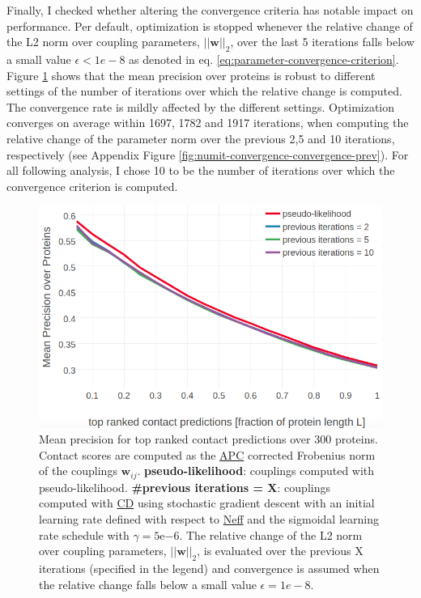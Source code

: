 \documentclass[11pt,a4paper,twoside]{book}
\newcommand{\eq}{\!=\!}
\newcommand{\w}{\mathbf{w}}
\newcommand{\wij}{\mathbf{w}_{ij}}
\theoremstyle{definition}
\theoremstyle{definition}
\theoremstyle{remark}
\begin{document}
Finally, I checked whether altering the convergence criteria has notable
impact on performance. Per default, optimization is stopped whenever the
relative change of the L2 norm over coupling parameters, \(||\w||_2\),
over the last 5 iterations falls below a small value \(\epsilon < 1e-8\)
as denoted in eq. \eqref{eq:parameter-convergence-criterion}. Figure
\ref{fig:performance-cd-convergence-prev} shows that the mean precision
over proteins is robust to different settings of the number of
iterations over which the relative change is computed. The convergence
rate is mildly affected by the different settings. Optimization
converges on average within 1697, 1782 and 1917 iterations, when
computing the relative change of the parameter norm over the previous
2,5 and 10 iterations, respectively (see Appendix Figure
\ref{fig:numit-convergence-convergence-prev}). For all following
analysis, I chose 10 to be the number of iterations over which the
convergence criterion is computed.















\begin{figure}

{\centering \includegraphics[width=0.9\linewidth]{img/full_likelihood/sgd/precision_vs_rank_convergence_prev} 

}

\caption{Mean precision for top
ranked contact predictions over 300 proteins. Contact scores are
computed as the \protect\hyperlink{abbrev}{APC} corrected Frobenius norm
of the couplings \(\wij\). \textbf{pseudo-likelihood}: couplings
computed with pseudo-likelihood. \textbf{\#previous iterations = X}:
couplings computed with \protect\hyperlink{abbrev}{CD} using stochastic
gradient descent with an initial learning rate defined with respect to
\protect\hyperlink{abbrev}{Neff} and the sigmoidal learning rate
schedule with \(\gamma \eq 5\mathrm{e}{-6}\). The relative change of the
L2 norm over coupling parameters, \(||\w||_2\), is evaluated over the
previous X iterations (specified in the legend) and convergence is
assumed when the relative change falls below a small value
\(\epsilon \eq 1e-8\).}\label{fig:performance-cd-convergence-prev}
\end{figure}
\end{document}
